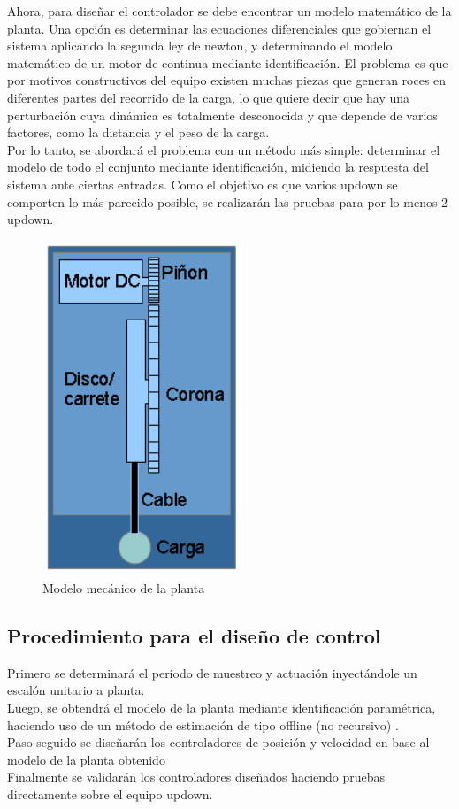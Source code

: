 Ahora, para diseñar el controlador se debe encontrar un modelo matemático de la planta. Una opción es determinar las ecuaciones diferenciales que gobiernan el sistema aplicando la segunda ley de newton, y determinando el modelo matemático de un motor de continua mediante identificación. El problema es que por motivos constructivos del equipo existen muchas piezas que generan roces en diferentes partes del recorrido de la carga, lo que quiere decir que hay una perturbación cuya dinámica es totalmente desconocida y que depende de varios factores, como la distancia y el peso de la carga.\\
Por lo tanto, se abordará el problema con un método más simple: determinar el modelo de todo el conjunto mediante identificación, midiendo la respuesta del sistema ante ciertas entradas. Como el objetivo es que varios updown se comporten lo más parecido posible, se realizarán las pruebas para por lo menos 2 updown. 

\begin{figure}[!ht]
	\centering
	\includegraphics[width=6cm,scale=1]{resources/2_2-modeloMecPlanta.png}
	\caption{Modelo mecánico de la planta}
	\label{fig:\thefigure}
\end{figure}


\subsection{Procedimiento para el diseño de control}
Primero se determinará el período de muestreo y actuación inyectándole un escalón unitario a planta.\\
Luego, se obtendrá el modelo de la planta mediante identificación paramétrica, haciendo uso de un método de estimación de tipo offline (no recursivo) \cite{sec2_3_3}.\\
Paso seguido se diseñarán los controladores de posición y velocidad en base al modelo de la planta obtenido\\
Finalmente se validarán los controladores diseñados haciendo pruebas directamente sobre el equipo updown.

